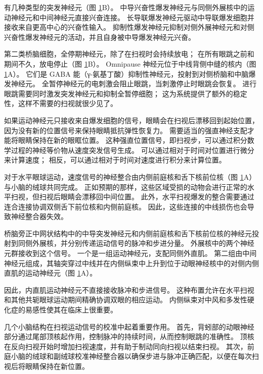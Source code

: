 \begin{figure}[htbp]
	\label{fig:35_8}
\end{figure}


有几种类型的突发神经元（图 \ref{fig:35_8}B）。 中导兴奋性爆发神经元与同侧外展核中的运动神经元和中间神经元直接兴奋连接。
长导联爆发神经元驱动中导联爆发细胞并接收来自更高中心的兴奋性输入。
抑制性爆发神经元抑制对侧外展神经元和对侧兴奋性爆发神经元的活动，并且自身被中导爆发神经元兴奋。


第二类桥脑细胞，全停期神经元，除了在扫视时会持续放电；
在所有眼跳之前和期间不久，放电停止（图 \ref{fig:35_8}B）。
Omnipause 神经元位于中线背侧中缝的核内（图 \ref{fig:35_8}A）。
它们是 GABA 能（γ-氨基丁酸）抑制性神经元，投射到对侧桥脑和中脑爆发神经元。
全暂停神经元的电刺激会阻止眼跳，当刺激停止时眼跳会恢复。
进行眼跳需要同时激发突发神经元和抑制全暂停细胞；
这为系统提供了额外的稳定性，这样不需要的扫视就很少见了。


如果运动神经元只接收来自爆发细胞的信号，眼睛会在扫视后漂移回到起始位置，因为没有新的位置信号来保持眼睛抵抗弹性恢复力。
需要适当的强直神经支配才能将眼睛保持在新的眼眶位置。
这种强直位置信号，即扫视步，可以通过积分数学过程的神经等价物从速度突发信号生成。
可以通过相对于时间对位置进行微分来计算速度；
相反，可以通过相对于时间对速度进行积分来计算位置。


对于水平眼球运动，速度信号的神经整合由内侧前庭核和舌下核前位核（图 \ref{fig:35_8}A）与小脑的绒球共同完成。
正如预期的那样，这些区域受损的动物会进行正常的水平扫视，但扫视后眼睛会漂移回中间位置。
此外，水平扫视爆发的整合需要通过连合连接协调双侧舌下前位核和内侧前庭核。
因此，这些连接的中线损伤也会导致神经整合器失效。


桥脑旁正中网状结构中的中导突发神经元和内侧前庭核和舌下核前位核的神经元投射到同侧外展核，并分别传递运动信号的脉冲和步进分量。
外展核中的两个神经元群接收到这个信号。
一个是一组运动神经元，支配同侧外直肌。
第二组由中间神经元组成，其轴突穿过中线并在内侧纵束中上升到位于动眼神经核中的对侧内侧直肌的运动神经元（图 \ref{fig:35_8}A）。


因此，内直肌运动神经元不直接接收脉冲和步进信号。
这种布置允许在水平扫视和其他共轭眼球运动期间精确协调双眼的相应运动。
内侧纵束对中风和多发性硬化症的易感性使其在临床上很重要。


几个小脑结构在扫视运动信号的校准中起着重要作用。
首先，背蚓部的动眼神经部分通过尾部顶核起作用，控制脉冲的持续时间，从而控制眼跳的准确性。
顶核在反向扫视开始时增加扫视速度，并有助于制动同向扫视以结束扫视。
其次，前庭小脑的绒球和副绒球校准神经整合器以确保步进与脉冲正确匹配，以便在每次扫视后将眼睛保持在新位置。



